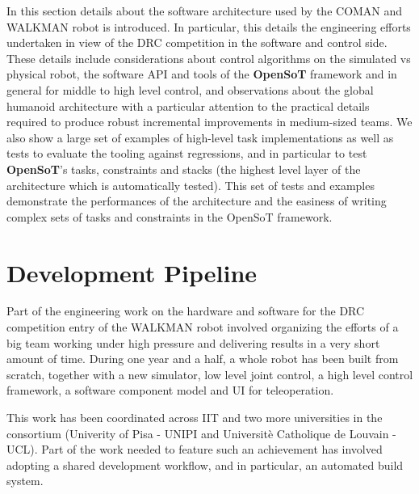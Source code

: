 
In this section details about the software architecture used by the COMAN and WALKMAN robot is introduced. In particular, this details the engineering efforts undertaken in view of the DRC competition in the software and control side. 
These details include considerations about control algorithms on the simulated vs physical robot, the software API and tools of the \textbf{OpenSoT} framework and in general for middle to high level control, and observations about the global humanoid architecture with a particular attention to the practical details required to produce robust incremental improvements in medium-sized teams. We also show a large set of examples of high-level task implementations as well as tests to evaluate the tooling against regressions, and in particular to test \textbf{OpenSoT}'s tasks, constraints and stacks (the highest level layer of the architecture which is automatically tested).
This set of tests and examples demonstrate the performances of the architecture and the easiness of writing complex sets of tasks and constraints in the OpenSoT framework.

\section{Development Pipeline}
Part of the engineering work on the hardware and software for the DRC competition entry of the WALKMAN robot involved organizing the efforts of a big team working under high pressure and delivering results in a very short amount of time.
During one year and a half, a whole robot has been built from scratch, together with a new simulator, low level joint control, a high level control framework, a software component model and UI for teleoperation.

This work has been coordinated across IIT and two more universities in the consortium (Univerity of Pisa - UNIPI and Universit\`e Catholique de Louvain - UCL). Part of the work needed to feature such an achievement has involved adopting a shared development workflow, and in particular, an automated build system.


